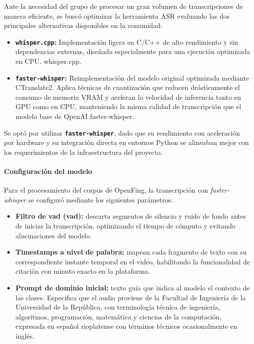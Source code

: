 Ante la necesidad del grupo de procesar un gran volumen de transcripciones de manera eficiente, se buscó optimizar la herramienta ASR evaluando las dos principales alternativas disponibles en la comunidad:

\begin{itemize}
    \item \textbf{\texttt{whisper.cpp}:} Implementación ligera en C/C++ de alto rendimiento y sin dependencias externas, diseñada especialmente para una ejecución optimizada en CPU. whisper.cpp. \cite{whispercpp}
    \item \textbf{\texttt{faster-whisper}:} Reimplementación del modelo original optimizada mediante CTranslate2. Aplica técnicas de cuantización que reducen drásticamente el consumo de memoria VRAM y aceleran la velocidad de inferencia tanto en GPU como en CPU, manteniendo la misma calidad de transcripción que el modelo base de OpenAI faster-whisper. \cite{fasterwhisper}
\end{itemize}

Se optó por utilizar \textbf{\texttt{faster-whisper}}, dado que su rendimiento con aceleración por hardware y su integración directa en entornos Python se alineaban mejor con los requerimientos de la infraestructura del proyecto.

\paragraph{Configuración del modelo}
Para el procesamiento del corpus de OpenFing, la transcripción con \textit{faster-whisper} se configuró mediante los siguientes parámetros:

\begin{itemize}
    \item \textbf{Filtro de \acrlong{vad} (\acrshort{vad}):} descarta segmentos de silencio y ruido de fondo antes de iniciar la transcripción, optimizando el tiempo de cómputo y evitando alucinaciones del modelo.
    \item \textbf{Timestamps a nivel de palabra:} mapean cada fragmento de texto con su correspondiente instante temporal en el video, habilitando la funcionalidad de citación con minuto exacto en la plataforma.
    \item \textbf{Prompt de dominio inicial:} texto guía que indica al modelo el contexto de las clases. Especifica que el audio proviene de la Facultad de Ingeniería de la Universidad de la República, con terminología técnica de ingeniería, algoritmos, programación, matemática y ciencias de la computación, expresada en español rioplatense con términos técnicos ocasionalmente en inglés.
\end{itemize}

